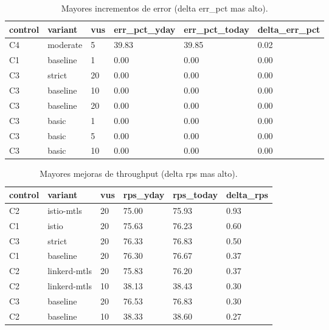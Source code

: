 \documentclass[11pt]{article}
\begin{document}
\begin{table}[h]
\centering
\small
\begin{tabular}{llllll}
\hline
control & variant & vus & err\_pct\_yday & err\_pct\_today & delta\_err\_pct \\
\hline
C4 & moderate & 5 & 39.83 & 39.85 & 0.02 \\
C1 & baseline & 1 & 0.00 & 0.00 & 0.00 \\
C3 & strict & 20 & 0.00 & 0.00 & 0.00 \\
C3 & baseline & 10 & 0.00 & 0.00 & 0.00 \\
C3 & baseline & 20 & 0.00 & 0.00 & 0.00 \\
C3 & basic & 1 & 0.00 & 0.00 & 0.00 \\
C3 & basic & 5 & 0.00 & 0.00 & 0.00 \\
C3 & basic & 10 & 0.00 & 0.00 & 0.00 \\
\hline
\end{tabular}
\caption{Mayores incrementos de error (delta err\_pct mas alto).}
\label{tab:worst_err}
\end{table}

\begin{table}[h]
\centering
\small
\begin{tabular}{llllll}
\hline
control & variant & vus & rps\_yday & rps\_today & delta\_rps \\
\hline
C2 & istio-mtls & 20 & 75.00 & 75.93 & 0.93 \\
C1 & istio & 20 & 75.63 & 76.23 & 0.60 \\
C3 & strict & 20 & 76.33 & 76.83 & 0.50 \\
C1 & baseline & 20 & 76.30 & 76.67 & 0.37 \\
C2 & linkerd-mtls & 20 & 75.83 & 76.20 & 0.37 \\
C2 & linkerd-mtls & 10 & 38.13 & 38.43 & 0.30 \\
C3 & baseline & 20 & 76.53 & 76.83 & 0.30 \\
C2 & baseline & 10 & 38.33 & 38.60 & 0.27 \\
\hline
\end{tabular}
\caption{Mayores mejoras de throughput (delta rps mas alto).}
\label{tab:top_rps}
\end{table}
\end{document}
